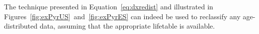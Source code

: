 The technique presented in Equation~\ref{eq:dxredist} and illustrated in
Figures~\ref{fig:exPyrUS}~and~\ref{fig:exPyrES} can indeed be used to reclassify
any age-distributed data, assuming that the appropriate lifetable is available.
